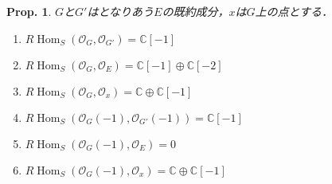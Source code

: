 \documentclass[uplatex,a4paper,11pt,dvipdfmx]{jsarticle}
\theoremstyle{mystyle} %
\newtheorem{proposition}[theorem]{Prop.}
\DeclareMathOperator{\Hom}{Hom}
\begin{document}
\begin{proposition}
	$G$と$G'$はとなりあう$E$の既約成分，$x$は$G$上の点とする．
	\begin{enumerate}
		\item $R\Hom_S(\mathcal{O}_G, \mathcal{O}_{G'}) = \mathbb{C}[-1]$
		\item $R\Hom_S(\mathcal{O}_G, \mathcal{O}_E) = \mathbb{C}[-1]\oplus\mathbb{C}[-2]$
		\item $R\Hom_S(\mathcal{O}_G, \mathcal{O}_x) = \mathbb{C}\oplus\mathbb{C}[-1]$
		\item $R\Hom_S(\mathcal{O}_G(-1), \mathcal{O}_{G'}(-1)) = \mathbb{C}[-1]$
		\item $R\Hom_S(\mathcal{O}_G(-1), \mathcal{O}_E) = 0$
		\item $R\Hom_S(\mathcal{O}_G(-1), \mathcal{O}_x) = \mathbb{C}\oplus\mathbb{C}[-1]$
	\end{enumerate}
\end{proposition}
\end{document}
